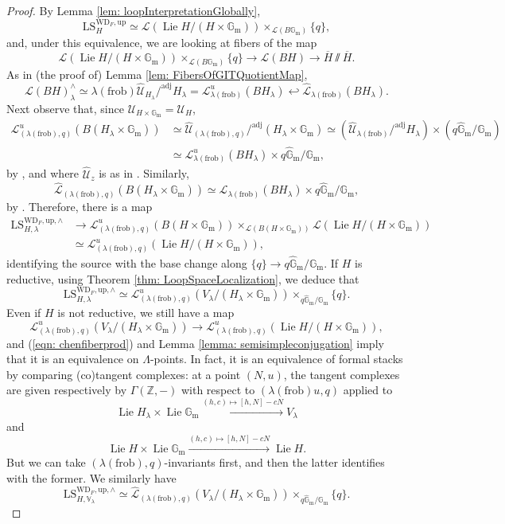 \documentclass{amsart}
\theoremstyle{definition}
\theoremstyle{remark}
\numberwithin{equation}{section}
\DeclareMathOperator{\Lie}{Lie}
\newcommand{\mc}{\mathcal}
\newcommand{\bb}{\mathbb}
\newcommand{\Z}{\mathbb{Z}}
\newcommand{\Gm}{{\mathbb{G}_{\mathrm{m}}}}
\newcommand{\wh}{\widehat}
\newcommand{\frob}{\mathrm{frob}}
\newcommand{\V}{\mathbb{V}}
\newcommand{\up}{\mathrm{up}}
\newcommand{\WD}{\mathrm{WD}}
\newcommand{\LS}{\mathrm{LS}}
\newcommand{\adj}{\mathrm{adj}}
\begin{document}
\begin{proof}
By Lemma \ref{lem: loopInterpretationGlobally}, 
\[
\LS_{H}^{\WD_F, \up} \simeq \mc L (\Lie H/ (H\times \Gm))\times_{\mc L(B\Gm)}\{q\},
\]
and, under this equivalence, we are looking at fibers of the map
\[
\mc L (\Lie H/ (H\times \Gm))\times_{\mc L(B\Gm)}\{q\} \to \mc L(BH) \to \overline{H} \sslash \overline{H}.
\]
As in (the proof of) Lemma \ref{lem: FibersOfGITQuotientMap}, 
\[
\mc L(BH)^{\wedge}_{\lambda}\simeq \lambda (\frob)\wh{\mc U}_{H_\lambda} /^\adj H_\lambda =\mc L_{\lambda(\frob)}^u(BH_\lambda) \hookleftarrow \wh{\mc L}_{\lambda(\frob)}(BH_\lambda). 
\]
Next observe that, since $\mc U_{H\times \Gm}=\mc U_H$, 
\begin{align*}
    \mc{L}^u_{(\lambda(\frob),q)}(B(H_{\lambda} \times \Gm)) & \simeq \wh{ \mc U}_{(\lambda(\frob), q)}/^\adj (H_{\lambda} \times \Gm) \simeq  (\wh{\mc U}_{\lambda(\frob)} /^\adj H_{\lambda}) \times (q\wh{\bb{G}}_\mathrm{m}/\Gm)  \\
     &\simeq  \mc{L}^u_{\lambda(\frob)}(BH_\lambda) \times q\wh{\bb G}_{\mathrm{m}}/ \Gm,
\end{align*}
by \cite[Definition 3.1.1, Propositions 2.1.25, 2.1.8]{Chenequivariant}, and where $\wh{ \mc U}_z$ is as in \cite[Definition 3.1.1]{Chenequivariant}. Similarly, 
\[
\wh{\mc{L}}_{(\lambda(\frob),q)}(B(H_{\lambda} \times \Gm))\simeq \wh{\mc{L}}_{\lambda(\frob)}(BH_\lambda)\times q\wh{\bb G}_{\mathrm{m}}/ \Gm,
\]
by \cite[Definition 3.1.1, Example 2.1.21, Proposition 2.1.8]{Chenequivariant}. Therefore, there is a map
\begin{align*}
\LS_{H, \lambda}^{\WD_F, \up, \wedge}
&\rightarrow
\mc L_{(\lambda(\frob), q)}^u(B(H\times \Gm))\times_{\mc L(B(H\times \Gm))} \mc L (\Lie H/ (H\times \Gm)) \\
&\simeq \mc L^u_{(\lambda (\frob), q)} (\Lie H / (H\times \Gm)),      
\end{align*}
identifying the source with the base change along $\{q\}\to q\wh{\bb G}_{\mathrm{m}}/\Gm$. 
If $H$ is reductive, using Theorem \ref{thm: LoopSpaceLocalization}, we deduce that
\[
\LS_{H, \lambda}^{\WD_F, \up, \wedge}
\simeq 
\mc L_{(\lambda(\frob), q)}^u (V_\lambda/ (H_\lambda\times \Gm))\times_{q\wh{\bb{G}}_{\mathrm{m}}/\Gm}\{q\}.
\]
Even if $H$ is not reductive, we still have a map
\[
\mc L_{(\lambda(\frob), q)}^u (V_\lambda/ (H_\lambda\times \Gm)) \to \mc L^u_{(\lambda (\frob), q)} (\Lie H / (H\times \Gm)),  
\]
and (\ref{eqn: chenfiberprod}) and Lemma \ref{lemma: semisimpleconjugation} imply that it is an equivalence on $\Lambda$-points. In fact, it is an equivalence of formal stacks by comparing (co)tangent complexes: at a point $(N, u)$, the tangent complexes are given respectively by $\Gamma (\Z,-)$ with respect to $(\lambda (\frob)u, q)$ applied to
\[
\Lie H_\lambda \times \Lie \Gm \xrightarrow{(h,c)\mapsto [h, N] -c N} V_\lambda
\]
and 
\[
\Lie H \times \Lie \Gm \xrightarrow{(h,c)\mapsto [h, N] -c N} \Lie H. 
\]
But we can take $(\lambda(\frob), q)$-invariants first, and then the latter identifies with the former.  
We similarly have
\[
\LS_{H, \V_\lambda}^{\WD_F, \up, \wedge} \simeq 
\wh{\mc L}_{(\lambda(\frob), q)} (V_\lambda/ (H_\lambda\times \Gm))\times_{q\wh{\bb{G}}_{\mathrm{m}}/\Gm}\{q\}.
\]


\end{proof}
\end{document}
